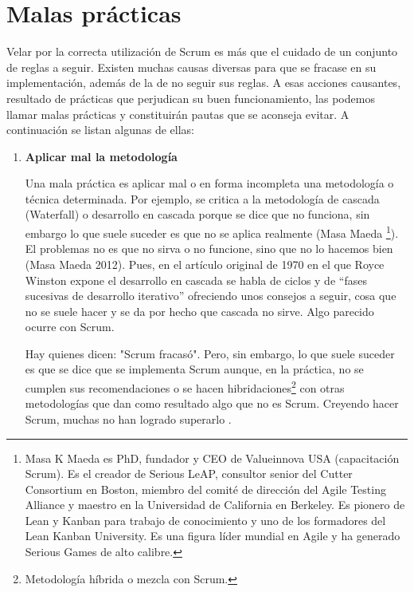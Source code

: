 
\chapter{Malas prácticas}

Velar por la correcta utilización de Scrum es más que el cuidado de un conjunto de reglas a seguir. Existen muchas causas diversas para que se fracase en su implementación, además de la de no seguir sus reglas. A esas acciones causantes, resultado de prácticas que perjudican su buen funcionamiento, las podemos llamar malas prácticas y constituirán pautas que se aconseja evitar.
A continuación se listan algunas de ellas:

\begin{enumerate}

\item \textbf{Aplicar mal la metodología}

Una mala práctica es aplicar mal o en forma incompleta una metodología o técnica determinada. Por ejemplo, se critica a la metodología de cascada (Waterfall) o desarrollo en cascada porque se dice que no funciona, sin embargo lo que suele suceder es que no se aplica realmente (Masa Maeda \footnote{Masa K Maeda es PhD, fundador y CEO de Valueinnova USA (capacitación Scrum). Es el creador de Serious LeAP, consultor senior del Cutter Consortium en Boston, miembro del comité de dirección del Agile Testing Alliance y maestro en la Universidad de California en Berkeley. Es pionero de Lean y Kanban para trabajo de conocimiento y uno de los formadores del Lean Kanban University. Es una figura líder mundial en Agile y ha generado Serious Games de alto calibre.}). El problemas no es que no sirva o no funcione, sino que no lo hacemos bien (Masa Maeda  2012). Pues, en el artículo original de 1970 en el que Royce Winston expone el desarrollo en cascada se habla de ciclos y de “fases sucesivas de desarrollo iterativo” \cite{Winston-Royce-1970} ofreciendo unos consejos a seguir, cosa que no se suele hacer y se da por hecho que cascada no sirve. Algo parecido ocurre con Scrum.

Hay quienes dicen:  "Scrum fracasó". Pero, sin embargo, lo que suele suceder es que se dice que se implementa Scrum aunque, en la práctica, no se cumplen sus recomendaciones o se hacen hibridaciones\footnote{Metodología híbrida o mezcla con Scrum.} con otras metodologías que dan como resultado algo que no es Scrum. Creyendo hacer Scrum, muchas no han logrado superarlo \cite{Gantthead-James-2010}.  


\end{enumerate}
